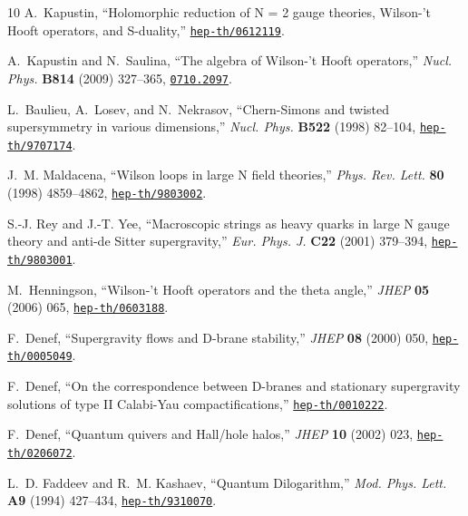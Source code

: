 \begin{thebibliography}{10}
A.~Kapustin, ``{Holomorphic reduction of N = 2 gauge theories, Wilson-'t Hooft
  operators, and S-duality},''
\href{http://www.arXiv.org/abs/hep-th/0612119}{{\tt hep-th/0612119}}.

A.~Kapustin and N.~Saulina, ``{The algebra of Wilson-'t Hooft operators},''
  {\em Nucl. Phys.} {\bf B814} (2009) 327--365,
\href{http://www.arXiv.org/abs/0710.2097}{{\tt 0710.2097}}.

L.~Baulieu, A.~Losev, and N.~Nekrasov, ``{Chern-Simons and twisted
  supersymmetry in various dimensions},'' {\em Nucl. Phys.} {\bf B522} (1998)
  82--104,
\href{http://www.arXiv.org/abs/hep-th/9707174}{{\tt hep-th/9707174}}.

J.~M. Maldacena, ``{Wilson loops in large N field theories},'' {\em Phys. Rev.
  Lett.} {\bf 80} (1998) 4859--4862,
\href{http://www.arXiv.org/abs/hep-th/9803002}{{\tt hep-th/9803002}}.

S.-J. Rey and J.-T. Yee, ``{Macroscopic strings as heavy quarks in large N
  gauge theory and anti-de Sitter supergravity},'' {\em Eur. Phys. J.} {\bf
  C22} (2001) 379--394,
\href{http://www.arXiv.org/abs/hep-th/9803001}{{\tt hep-th/9803001}}.

M.~Henningson, ``{Wilson-'t Hooft operators and the theta angle},'' {\em JHEP}
  {\bf 05} (2006) 065,
\href{http://www.arXiv.org/abs/hep-th/0603188}{{\tt hep-th/0603188}}.

F.~Denef, ``{Supergravity flows and D-brane stability},'' {\em JHEP} {\bf 08}
  (2000) 050,
\href{http://www.arXiv.org/abs/hep-th/0005049}{{\tt hep-th/0005049}}.

F.~Denef, ``{On the correspondence between D-branes and stationary supergravity
  solutions of type II Calabi-Yau compactifications},''
\href{http://www.arXiv.org/abs/hep-th/0010222}{{\tt hep-th/0010222}}.

F.~Denef, ``{Quantum quivers and Hall/hole halos},'' {\em JHEP} {\bf 10} (2002)
  023,
\href{http://www.arXiv.org/abs/hep-th/0206072}{{\tt hep-th/0206072}}.

L.~D. Faddeev and R.~M. Kashaev, ``{Quantum Dilogarithm},'' {\em Mod. Phys.
  Lett.} {\bf A9} (1994) 427--434,
\href{http://www.arXiv.org/abs/hep-th/9310070}{{\tt hep-th/9310070}}.


\end{thebibliography}

